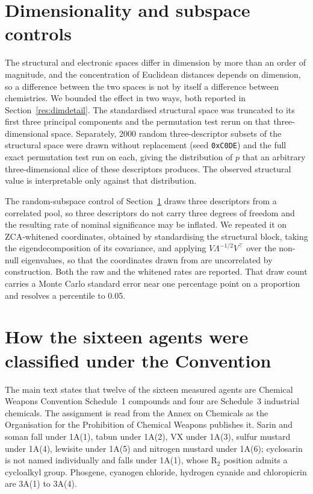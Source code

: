 \documentclass[journal=jacsat,manuscript=suppinfo,margin=1in]{achemso}
\begin{document}
\section{Dimensionality and subspace controls}
\label{meth:dimdetail}
The structural and electronic spaces differ in dimension by more than an order of
magnitude, and the concentration of Euclidean distances depends on dimension, so
a difference between the two spaces is not by itself a difference between
chemistries. We bounded the effect in two ways, both reported in
Section~\ref{res:dimdetail}. The standardised structural space was truncated to its
first three principal components and the permutation test rerun on that
three-dimensional space. Separately, 2000 random three-descriptor subsets of the
structural space were drawn without replacement (seed \texttt{0xC0DE}) and the
full exact permutation test run on each, giving the distribution of $p$ that an
arbitrary three-dimensional slice of these descriptors produces. The observed
structural value is interpretable only against that distribution.

The random-subspace control of Section~\ref{meth:dimdetail} draws three descriptors
from a correlated pool, so three descriptors do not carry three degrees of
freedom and the resulting rate of nominal significance may be inflated. We
repeated it on ZCA-whitened coordinates, obtained by standardising the
structural block, taking the eigendecomposition of its covariance, and applying
$V\Lambda^{-1/2}V^{\top}$ over the non-null eigenvalues, so that the coordinates
drawn from are uncorrelated by construction. Both the raw and the whitened rates
are reported. That draw count carries a Monte Carlo
standard error near one percentage point on a proportion and resolves a
percentile to 0.05.

\section{How the sixteen agents were classified under the Convention}
\label{meth:cwc}

The main text states that twelve of the sixteen measured agents are Chemical
Weapons Convention Schedule~1 compounds and four are Schedule~3 industrial
chemicals. The assignment is read from the Annex on Chemicals as the
Organisation for the Prohibition of Chemical Weapons publishes
it.\cite{opcwschedules} Sarin and soman fall under 1A(1), tabun under 1A(2), VX
under 1A(3), sulfur mustard under 1A(4), lewisite under 1A(5) and nitrogen
mustard under 1A(6); cyclosarin is not named individually and falls under
1A(1), whose R$_2$ position admits a cycloalkyl group. Phosgene, cyanogen
chloride, hydrogen cyanide and chloropicrin are 3A(1) to 3A(4).
\end{document}
